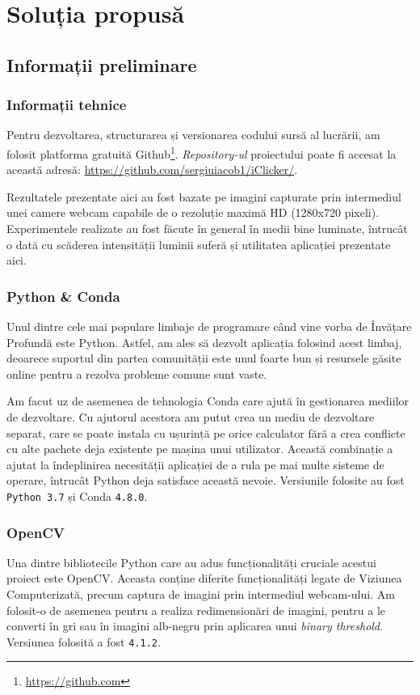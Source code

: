 \chapter{Soluția propusă}
\section{Informații preliminare}
\subsection{Informații tehnice}
Pentru dezvoltarea, structurarea și versionarea codului sursă al lucrării, am folosit platforma gratuită Github\footnote{\url{https://github.com}}.
\emph{Repository-ul} proiectului poate fi accesat la această adresă: \url{https://github.com/sergiuiacob1/iClicker/}.

Rezultatele prezentate aici au fost bazate pe imagini capturate prin intermediul unei camere webcam capabile de o rezoluție maximă HD (1280x720 pixeli).
Experimentele realizate au fost făcute în general în medii bine luminate, întrucât o dată cu scăderea intensității luminii suferă și utilitatea aplicației prezentate aici.

\subsection{Python \& Conda}
Unul dintre cele mai populare limbaje de programare când vine vorba de Învățare Profundă este Python.
Astfel, am ales să dezvolt aplicația folosind acest limbaj, deoarece suportul din partea comunității este unul foarte bun și resursele găsite online pentru a rezolva probleme comune sunt vaste.

Am facut uz de asemenea de tehnologia Conda care ajută în gestionarea mediilor de dezvoltare.
Cu ajutorul acestora am putut crea un mediu de dezvoltare separat, care se poate instala cu ușurință pe orice calculator fără a crea conflicte cu alte pachete deja existente pe mașina unui utilizator.
Această combinație a ajutat la îndeplinirea necesității aplicației de a rula pe mai multe sisteme de operare, întrucât Python deja satisface această nevoie.
Versiunile folosite au fost \lstinline{Python 3.7} și Conda \lstinline{4.8.0}.

\subsection{OpenCV}
Una dintre bibliotecile Python care au adus funcționalități cruciale acestui proiect este OpenCV.
Aceasta conține diferite funcționalități legate de Viziunea Computerizată, precum captura de imagini prin intermediul webcam-ului.
Am folosit-o de asemenea pentru a realiza redimensionări de imagini, pentru a le converti în gri sau în imagini alb-negru prin aplicarea unui \emph{binary threshold}.
Versiunea folosită a fost \lstinline{4.1.2}.

